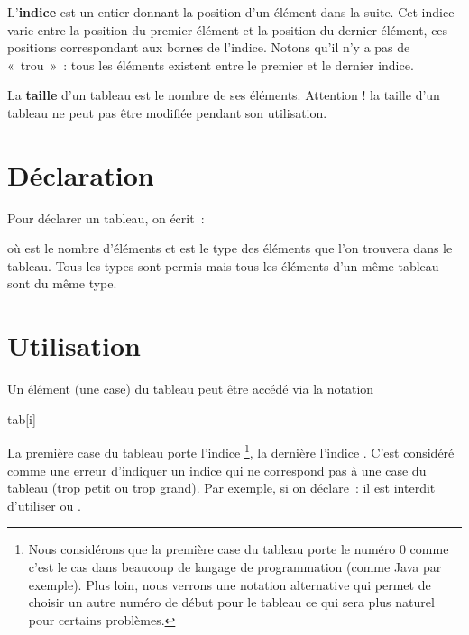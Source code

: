 		L’\textbf{indice} est un entier 
		donnant la position d’un élément dans la suite. 
		Cet indice varie entre la position du premier élément 
		et la position du dernier élément, 
		ces positions correspondant aux bornes de l’indice.
		Notons qu'il n'y a pas de «~trou~»~: 
		tous les éléments existent entre le premier et le dernier indice.
	
		La \textbf{taille} d’un tableau 
		est le nombre de ses éléments.
		Attention ! la taille d’un tableau ne peut pas être modifiée pendant
		son utilisation.
	
	\section{Déclaration}
	
		Pour déclarer un tableau, on écrit~:
	
		\begin{LDA}
		\end{LDA}

		où  est le nombre d'éléments 
		et  est le type des éléments 
			que l’on trouvera dans le tableau.
			Tous les types sont permis
			mais tous les éléments d'un même tableau
			sont du même type. 
		
	\section{Utilisation}
			
		Un élément (une case) du tableau peut être accédé
		via la notation
		\begin{LDA}
			\Stmt tab[i]	\Comment{élément du tableau 'tab' d'indice i}
		\end{LDA}
		La première case du tableau porte l'indice %
		\footnote{%
			Nous considérons que la première case du tableau
			porte le numéro 0 comme c'est le cas dans beaucoup de langage
			de programmation (comme Java par exemple).
			Plus loin, nous verrons une notation alternative
			qui permet de choisir un autre numéro de début pour le tableau
			ce qui sera plus naturel pour certains problèmes.
		},
		la dernière l'indice .
		C'est considéré comme une erreur d'indiquer un indice
		qui ne correspond pas à une case du tableau (trop petit ou trop grand).
		Par exemple, si on déclare~:
		il est interdit d’utiliser  ou
		. 

